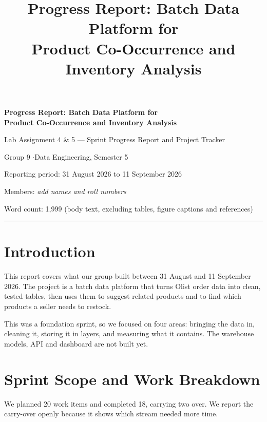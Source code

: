 \documentclass[11pt,a4paper]{article}
\title{\vspace{-1.5cm}\textbf{Progress Report: Batch Data Platform for\\Product Co-Occurrence and Inventory Analysis}}
\author{}
\date{}
\begin{document}
\begin{center}
  {\LARGE\bfseries Progress Report: Batch Data Platform for\\[2pt]
   Product Co-Occurrence and Inventory Analysis\par}
  \vspace{6pt}
  {\large Lab Assignment 4 \& 5 --- Sprint Progress Report and Project Tracker\par}
  \vspace{4pt}
  {\normalsize Group 9 \quad$\cdot$\quad Data Engineering, Semester 5\par}
  \vspace{2pt}
  {\small Reporting period: 31 August 2026 to 11 September 2026\par}
  \vspace{2pt}
  {\small Members: \textit{add names and roll numbers}\par}
  \vspace{2pt}
  {\footnotesize Word count: 1{,}999 (body text, excluding tables, figure captions and references)\par}
\end{center}
\vspace{2pt}
\hrule
\vspace{10pt}

\section{Introduction}
This report covers what our group built between 31 August and 11 September 2026. The project
is a batch data platform that turns Olist order data into clean, tested tables, then uses them
to suggest related products and to find which products a seller needs to restock.

This was a foundation sprint, so we focused on four areas: bringing the data in, cleaning it,
storing it in layers, and measuring what it contains. The warehouse models, API and dashboard
are not built yet.

\section{Sprint Scope and Work Breakdown}
We planned 20 work items and completed 18, carrying two over. We report the carry-over openly
because it shows which stream needed more time.
\end{document}
